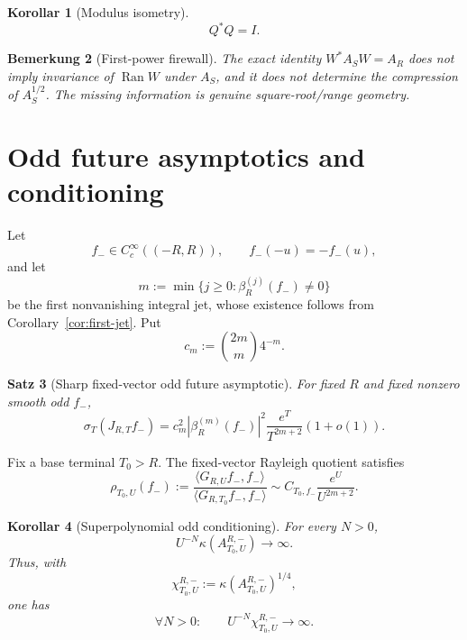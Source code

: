 \documentclass[11pt,a4paper]{amsart}
\newtheorem{theorem}{Satz}[section]
\newtheorem{corollary}[theorem]{Korollar}
\newtheorem{remark}[theorem]{Bemerkung}
\newcommand{\Ran}{\operatorname{Ran}}
\begin{document}
\begin{corollary}[Modulus isometry]\label{cor:modulus}
\[
 \boxed{Q^*Q=I.}
\]
\end{corollary}

\begin{remark}[First-power firewall]\label{rem:firstpower}
The exact identity $W^*A_SW=A_R$ does not imply invariance of $\Ran W$ under $A_S$, and
it does not determine the compression of $A_S^{1/2}$.  The missing information is
genuine square-root/range geometry.
\end{remark}



\section{Odd future asymptotics and conditioning}\label{sec:odd}

Let
\[
 f_-\in C_c^\infty((-R,R)),
 \qquad f_-(-u)=-f_-(u),
\]
and let
\[
 m:=\min\{j\ge0:\beta_R^{(j)}(f_-)\ne0\}
\]
be the first nonvanishing integral jet, whose existence follows from
Corollary~\ref{cor:first-jet}.  Put
\[
 c_m:=\binom{2m}{m}4^{-m}.
\]

\begin{theorem}[Sharp fixed-vector odd future asymptotic]\label{thm:odd}
For fixed $R$ and fixed nonzero smooth odd $f_-$,
\[
 \boxed{
 \sigma_T(J_{R,T}f_-)
 =c_m^2|\beta_R^{(m)}(f_-)|^2
 \frac{e^T}{T^{2m+2}}(1+o(1)).
 }
\tag{6.1}\label{eq:odd-asymptotic}
\]
\end{theorem}



Fix a base terminal $T_0>R$.  The fixed-vector Rayleigh quotient satisfies
\[
 \rho_{T_0,U}(f_-)
 :=\frac{\langle G_{R,U}f_-,f_-\rangle}
         {\langle G_{R,T_0}f_-,f_-\rangle}
 \sim C_{T_0,f_-}\frac{e^U}{U^{2m+2}}.
\]

\begin{corollary}[Superpolynomial odd conditioning]\label{cor:conditioning}
For every $N>0$,
\[
 \boxed{U^{-N}\kappa(A_{T_0,U}^{R,-})\longrightarrow\infty.}
\]
Thus, with
\[
 \chi_{T_0,U}^{R,-}:=\kappa(A_{T_0,U}^{R,-})^{1/4},
\]
one has
\[
 \boxed{\forall N>0:\qquad U^{-N}\chi_{T_0,U}^{R,-}\longrightarrow\infty.}
\]
\end{corollary}




\end{document}

